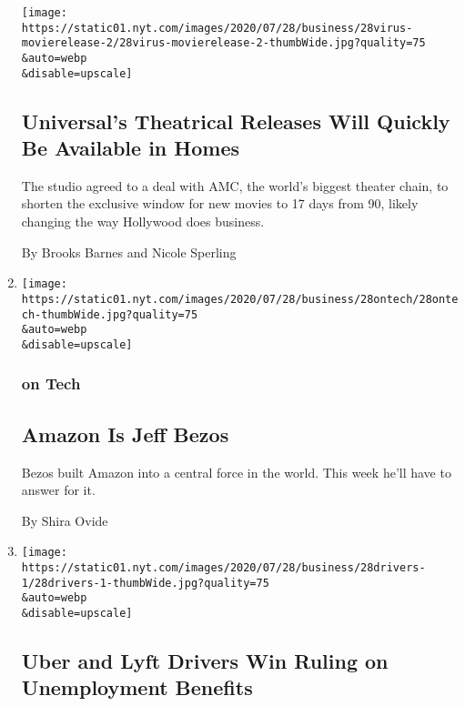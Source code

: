 \begin{enumerate}
  \texttt{[image: https://static01.nyt.com/images/2020/07/28/business/28virus-movierelease-2/28virus-movierelease-2-thumbWide.jpg?quality=75\\\&auto=webp\\\&disable=upscale]}

  \hypertarget{universals-theatrical-releases-will-quickly-be-available-in-homes}{%
  \subsection{Universal's Theatrical Releases Will Quickly Be Available
  in
  Homes}\label{universals-theatrical-releases-will-quickly-be-available-in-homes}}

  The studio agreed to a deal with AMC, the world's biggest theater
  chain, to shorten the exclusive window for new movies to 17 days from
  90, likely changing the way Hollywood does business.

  By Brooks Barnes and Nicole Sperling
\item
  \href{/2020/07/28/technology/amazon-jeff-bezos.html}{}

  \texttt{[image: https://static01.nyt.com/images/2020/07/28/business/28ontech/28ontech-thumbWide.jpg?quality=75\\\&auto=webp\\\&disable=upscale]}

  \hypertarget{on-tech-1}{%
  \subsubsection{on Tech}\label{on-tech-1}}

  \hypertarget{amazon-is-jeff-bezos}{%
  \subsection{Amazon Is Jeff Bezos}\label{amazon-is-jeff-bezos}}

  Bezos built Amazon into a central force in the world. This week he'll
  have to answer for it.

  By Shira Ovide
\item
  \href{/2020/07/28/business/economy/lyft-uber-drivers-unemployment.html}{}

  \texttt{[image: https://static01.nyt.com/images/2020/07/28/business/28drivers-1/28drivers-1-thumbWide.jpg?quality=75\\\&auto=webp\\\&disable=upscale]}

  \hypertarget{uber-and-lyft-drivers-win-ruling-on-unemployment-benefits}{%
  \subsection{Uber and Lyft Drivers Win Ruling on Unemployment
  Benefits}\label{uber-and-lyft-drivers-win-ruling-on-unemployment-benefits}}


\end{enumerate}
